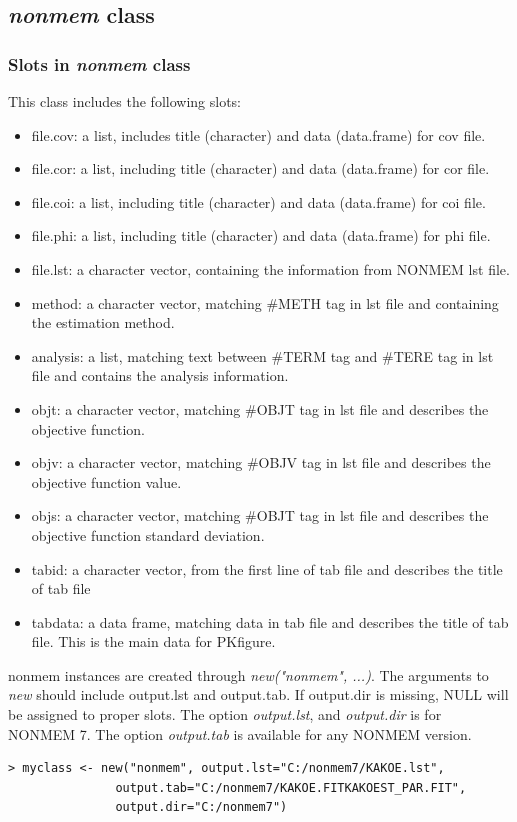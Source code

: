 \documentclass[a4paper]{article}
\begin{document}
\subsection{\textit{nonmem} class}
\subsubsection{Slots in \textit{nonmem} class}
This class includes the following slots:
\begin{itemize}
	\item file.cov: a list, includes title (character) and data (data.frame) for cov file.
	\item file.cor: a list, including title (character) and data (data.frame) for cor file.
	\item file.coi: a list, including title (character) and data (data.frame) for coi file.
	\item file.phi: a list, including title (character) and data (data.frame) for phi file.
\item file.lst: a character vector, containing the information from NONMEM lst file.
\item method: a character vector, matching \#METH tag in lst file and containing the estimation method.
\item analysis: a list, matching text between \#TERM tag and \#TERE tag in lst file and contains the analysis information.
	\item objt: a character vector, matching \#OBJT tag in lst file and describes the objective function.
	\item objv: a character vector, matching \#OBJV tag in lst file and describes the objective function value.
	\item objs: a character vector, matching \#OBJT tag in lst file and describes the objective function standard deviation.
\item tabid: a character vector, from the first line of tab file and describes the title of tab file
\item tabdata: a data frame, matching data in tab file and describes the title of tab file. This is the main data for PKfigure.
\end{itemize}
nonmem instances are created through \textit{new("nonmem", ...)}.
The arguments to \textit{new} should include output.lst and output.tab.
If output.dir is missing, NULL will be assigned to proper slots.
The option \textit{output.lst}, and \textit{ output.dir} is for NONMEM 7. The option \textit{ output.tab} is available for any NONMEM version.
\begin{verbatim}
> myclass <- new("nonmem", output.lst="C:/nonmem7/KAKOE.lst",
               output.tab="C:/nonmem7/KAKOE.FITKAKOEST_PAR.FIT",
               output.dir="C:/nonmem7")

\end{verbatim}
\end{document}
